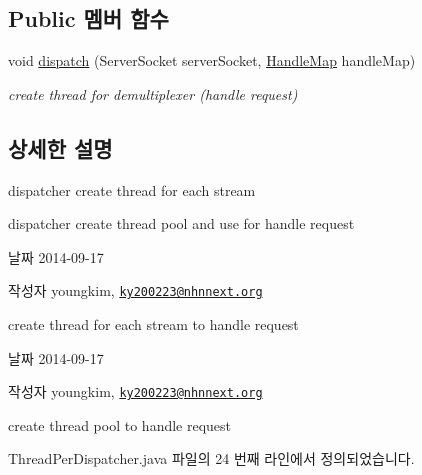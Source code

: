 \subsection*{Public 멤버 함수}
\begin{DoxyCompactItemize}
\item 
void \hyperlink{classweek8__server_1_1_thread_per_dispatcher_acf253a1552859366b9420eb3ede8ea49}{dispatch} (Server\-Socket server\-Socket, \hyperlink{classweek8__server_1_1_handle_map}{Handle\-Map} handle\-Map)
\begin{DoxyCompactList}\small\item\em create thread for demultiplexer (handle request) \end{DoxyCompactList}\end{DoxyCompactItemize}


\subsection{상세한 설명}
dispatcher create thread for each stream 

dispatcher create thread pool and use for handle request

\begin{DoxyDate}{날짜}
2014-\/09-\/17 
\end{DoxyDate}
\begin{DoxyAuthor}{작성자}
youngkim, \href{mailto:ky200223@nhnnext.org}{\tt ky200223@nhnnext.\-org}
\end{DoxyAuthor}
create thread for each stream to handle request

\begin{DoxyDate}{날짜}
2014-\/09-\/17 
\end{DoxyDate}
\begin{DoxyAuthor}{작성자}
youngkim, \href{mailto:ky200223@nhnnext.org}{\tt ky200223@nhnnext.\-org}
\end{DoxyAuthor}
create thread pool to handle request 

Thread\-Per\-Dispatcher.\-java 파일의 24 번째 라인에서 정의되었습니다.



